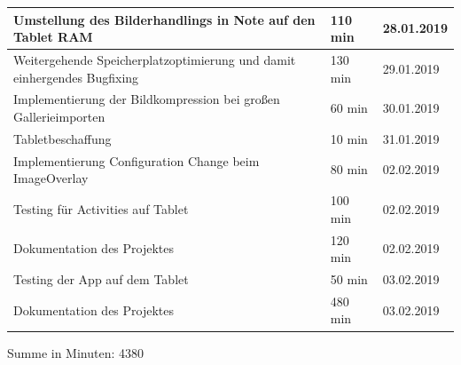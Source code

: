 \begin{longtable}{|p{10cm}|p{2cm}|p{2cm}|}
		Umstellung des Bilderhandlings in Note auf den Tablet RAM                                & 110 min                               & 28.01.2019                            \\ \hline
		Weitergehende Speicherplatzoptimierung und damit einhergendes Bugfixing                  & 130 min                               & 29.01.2019                            \\ \hline
		Implementierung der Bildkompression bei großen Gallerieimporten                          & 60 min                                & 30.01.2019                            \\ \hline
		Tabletbeschaffung                                                                        & 10 min                                & 31.01.2019                            \\ \hline
		Implementierung Configuration Change beim ImageOverlay                                   & 80 min                                & 02.02.2019                            \\ \hline
		Testing für Activities auf Tablet                                                        & 100 min                               & 02.02.2019                            \\ \hline
		Dokumentation des Projektes                                                              & 120 min                               & 02.02.2019                            \\ \hline
		Testing der App auf dem Tablet                                                           & 50 min                                & 03.02.2019                            \\ \hline
		Dokumentation des Projektes                                                              & 480 min                               & 03.02.2019                            \\ \hline
\end{longtable}
Summe in Minuten: 4380

\newpage
